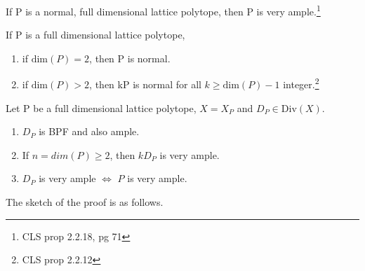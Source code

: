 \documentclass[a4paper,12pt]{amsart}
\begin{document}
\begin{proposition}\label{prop:polyample}
	If P is a normal, full dimensional lattice polytope, then P is very ample.\footnote{ CLS prop 2.2.18, pg 71}
\end{proposition}
\begin{proposition}\label{prop:polynormal}
	If P is a full dimensional lattice polytope,
	\begin{enumerate}
		\item if $\text{dim}(P) = 2$, then P is normal.
		\item if $\text{dim}(P)>2$, then kP is normal for all $k \geq \text{dim}(P)-1$ integer.\footnote{CLS prop 2.2.12}
	\end{enumerate}
\end{proposition}
\begin{theorem}
	Let P be a full dimensional lattice polytope, $X=X_P$ and $D_P \in \text{Div}(X)$.
	\begin{enumerate}
		\item $D_P$ is BPF and also ample.
		\item If $n=dim(P) \geq 2$, then $k D_P$ is very ample.
		\item $D_P$ is very ample $\Leftrightarrow$ $P$ is very ample.
	\end{enumerate}
\end{theorem}
The sketch of the proof is as follows.
\end{document}
